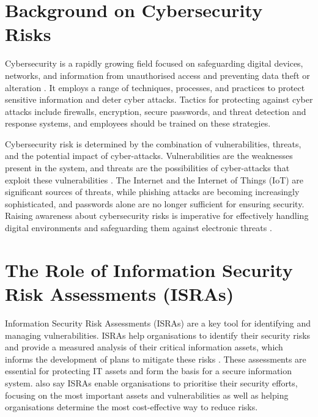 \section{Background on Cybersecurity Risks}
Cybersecurity is a rapidly growing field focused on safeguarding digital devices, networks, and information from unauthorised access and preventing data theft or alteration \citep{mijwil2023exploring}. It employs a range of techniques, processes, and practices to protect sensitive information and deter cyber attacks. Tactics for protecting against cyber attacks include firewalls, encryption, secure passwords, and threat detection and response systems, and employees should be trained on these strategies.

Cybersecurity risk is determined by the combination of vulnerabilities, threats, and the potential impact of cyber-attacks. Vulnerabilities are the weaknesses present in the system, and threats are the possibilities of cyber-attacks that exploit these vulnerabilities \citep{prasad2020cyber}. The Internet and the Internet of Things (IoT) are significant sources of threats, while phishing attacks are becoming increasingly sophisticated, and passwords alone are no longer sufficient for ensuring security. Raising awareness about cybersecurity risks is imperative for effectively handling digital environments and safeguarding them against electronic threats \citep{mijwil2023exploring}.

\section{The Role of Information Security Risk Assessments (ISRAs)}
Information Security Risk Assessments (ISRAs) are a key tool for identifying and managing vulnerabilities. ISRAs help organisations to identify their security risks and provide a measured analysis of their critical information assets, which informs the development of plans to mitigate these risks \citep{shedden2010information}. These assessments are essential for protecting IT assets and form the basis for a secure information system. \citet{shedden2010information} also say ISRAs enable organisations to prioritise their security efforts, focusing on the most important assets and vulnerabilities as well as helping organisations determine the most cost-effective way to reduce risks.

